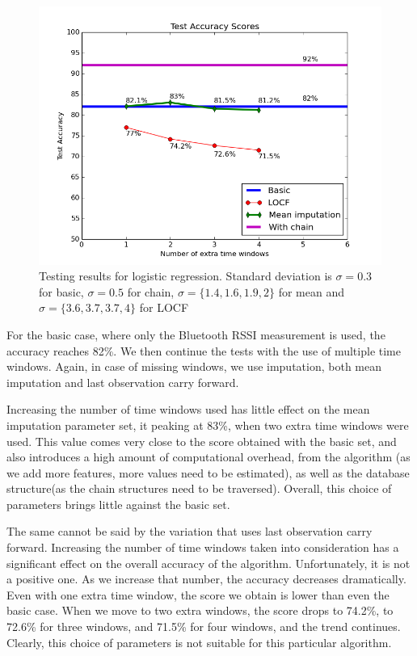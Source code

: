 \begin{figure}[h]
	\begin{center}
		\includegraphics[scale=0.7]{figures/logic_tot.png}
	\end{center}
	
	\caption{Testing results for logistic regression. Standard deviation is $\sigma= 0.3 $ for basic, $\sigma= 0.5 $ for chain, $\sigma=\lbrace 1.4, 1.6, 1.9, 2 \rbrace $ for mean and  $\sigma=\lbrace 3.6, 3.7, 3.7, 4 \rbrace$ for LOCF}
	\label{pic:logic_tot}

\end{figure}

For the basic case, where only the Bluetooth RSSI measurement is used, the accuracy reaches 82\%. We then continue the tests with the use of multiple time windows. Again, in case of missing windows, we use imputation, both mean imputation and last observation carry forward. 

Increasing the number of time windows used has little effect on the mean imputation parameter set, it peaking at 83\%, when two extra time windows were used. This value comes very close to the score obtained with the basic set, and also introduces a high amount of computational overhead, from the algorithm (as we add more features, more values need to be estimated), as well as the database structure(as the chain structures need to be traversed). Overall, this choice of parameters brings little against the basic set.

The same cannot be said by the variation that uses last observation carry forward. Increasing the number of time windows taken into consideration has a significant effect on the overall accuracy of the algorithm. Unfortunately, it is not a positive one. As we increase that number, the accuracy decreases dramatically. Even with one extra time window, the score we obtain is lower than even the basic case. When we move to two extra windows, the score drops to 74.2\%, to 72.6\% for three windows, and 71.5\% for four windows, and the trend continues. Clearly, this choice of parameters is not suitable for this particular algorithm. 

